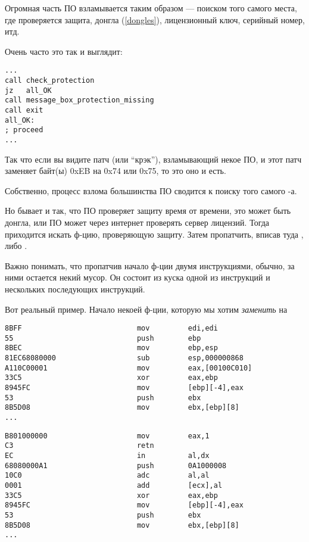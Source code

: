 \label{\SoftwareCracking}

Огромная часть ПО взламывается таким образом --- поиском того самого места, где проверяется защита, донгла (\ref{dongles}),
лицензионный ключ, серийный номер, итд.

Очень часто это так и выглядит:

\begin{lstlisting}[style=customasmx86]
...
call check_protection
jz   all_OK
call message_box_protection_missing
call exit
all_OK:
; proceed
...
\end{lstlisting}

Так что если вы видите патч (или ``крэк''), взламывающий некое ПО,
и этот патч заменяет байт(ы) 0xEB на 0x74 или 0x75, то это оно и есть.

Собственно, процесс взлома большинства ПО сводится к поиску того самого -а.

\myhrule{}

Но бывает и так, что ПО проверяет защиту время от времени, это может быть донгла,
или ПО может через интернет проверять сервер лицензий.
Тогда приходится искать ф-цию, проверяющую защиту.
Затем пропатчить, вписав туда , либо .

Важно понимать, что пропатчив начало ф-ции двумя инструкциями, обычно, за ними остается некий мусор.
Он состоит из куска одной из инструкций и нескольких последующих инструкций.

Вот реальный пример.
Начало некоей ф-ции, которую мы хотим \emph{заменить} на 

\begin{lstlisting}[style=customasmx86,caption=Было]
8BFF                           mov         edi,edi
55                             push        ebp
8BEC                           mov         ebp,esp
81EC68080000                   sub         esp,000000868
A110C00001                     mov         eax,[00100C010]
33C5                           xor         eax,ebp
8945FC                         mov         [ebp][-4],eax
53                             push        ebx
8B5D08                         mov         ebx,[ebp][8]
...
\end{lstlisting}

\begin{lstlisting}[style=customasmx86,caption=Стало]
B801000000                     mov         eax,1
C3                             retn
EC                             in          al,dx
68080000A1                     push        0A1000008
10C0                           adc         al,al
0001                           add         [ecx],al
33C5                           xor         eax,ebp
8945FC                         mov         [ebp][-4],eax
53                             push        ebx
8B5D08                         mov         ebx,[ebp][8]
...
\end{lstlisting}

